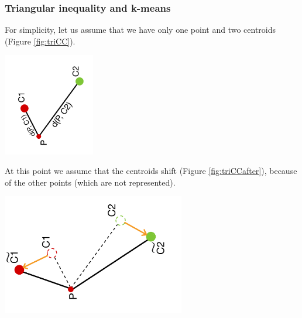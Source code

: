 \documentclass{report}
\begin{document}
\begin{minipage}[b]{0.48\textwidth}
  \subsubsection*{Triangular inequality and k-means}
  For simplicity, let us assume that we have only one point and two centroids (Figure \ref{fig:triCC}).  

  \begin{center}
      \includegraphics[width = 0.3\textwidth]{imgs/triCC.png}
      \label{fig:triCC}
  \end{center}

  At this point we assume that the centroids shift (Figure \ref{fig:triCCafter}), because of the other points (which are not represented).

  \begin{center}
      \includegraphics[width = 0.6\textwidth]{imgs/triCCAfter.png}
      \label{fig:triCCafter}
  \end{center}   
\end{minipage}
\hspace{0.1in}
\end{document}
